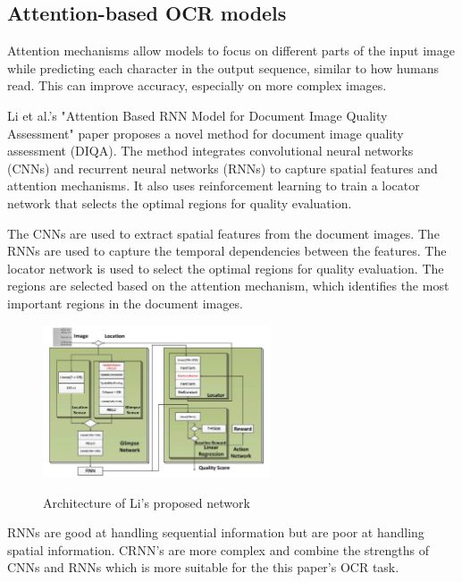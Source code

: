 \newpage

\subsection{Attention-based OCR models}

Attention mechanisms allow models to focus on different parts of the input image while predicting each character in the output sequence, similar to how humans read. This can improve accuracy, especially on more complex images.

Li et al.'s "Attention Based RNN Model for Document Image Quality Assessment" paper proposes a novel method for document image quality assessment (DIQA). The method integrates convolutional neural networks (CNNs) and recurrent neural networks (RNNs) to capture spatial features and attention mechanisms. It also uses reinforcement learning to train a locator network that selects the optimal regions for quality evaluation.

The CNNs are used to extract spatial features from the document images. The RNNs are used to capture the temporal dependencies between the features. The locator network is used to select the optimal regions for quality evaluation. The regions are selected based on the attention mechanism, which identifies the most important regions in the document images. \cite{liAttentionBasedRNN2017}


\begin{figure}[ht]
    \centering
    \includegraphics[width=0.6\textwidth]{Figures/AT_Li.jpg}
    \caption[Architecture of Li's proposed network]{Architecture of Li's proposed network}\cite{liAttentionBasedRNN2017}
    \label{fig:Li's Proposed Architecture}
\end{figure}

RNNs are good at handling sequential information but are poor at handling spatial information. CRNN's are more complex and combine the strengths of CNNs and RNNs which is more suitable for the this paper's OCR task.



